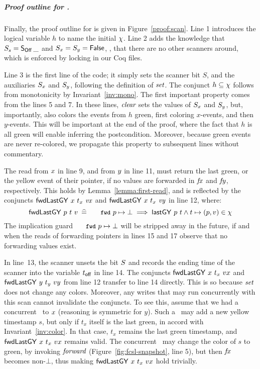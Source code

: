 

\subparagraph{Proof outline for \jyscan.}
%
Finally, the proof outline for is given in
Figure~\ref{proof:scan}. Line 1 introduces the logical variable $h$ to
name the initial $\chi$. Line 2 adds the knowledge that $S_s =
\mathsf{S_{Off}}\, \_$ and $S_x = S_y = \mathsf{False}$, \ie, that there are no other
scanners around, which is enforced by locking in our Coq files.

Line 3 is the first line of the code; it simply sets the scanner bit
$S$, and the auxiliaries $S_x$ and $S_y$, following the definition of
$\textit{set}$. The conjunct $h \subseteq \chi$ follows from
monotonicity by Invariant~\ref{inv:mono}.
%
The first important property comes from the lines 5 and 7. In these
lines, $\textit{clear}$ sets the values of $S_x$ and $S_y$, but,
importantly, also colors the events from $h$ green, first coloring
$x$-events, and then $y$-events. This will be important at the end of
the proof, where the fact that $h$ is all green will enable inferring
the postcondition. Moreover, because green events are never
re-colored, we propagate this property to subsequent lines without
commentary.

The read from $x$ in line 9, and from $y$ in line 11, must return
the last green, or the yellow event of their pointer, if no values are
forwarded in $\mathit{fx}$ and $\mathit{fy}$, respectively. This holds by
Lemma~\ref{lemma:first-read}, and is reflected by the conjuncts
$\botLGY\ x\ t_x\ \var{vx}$ and $\botLGY\ x\ t_x\ \var{vy}$ in line
12, where:
%
\[
 \hfill \botLGY\ p\ t\ v \eqdef \aleksfwdp{p} \hpts \bot
 \implies \lgVy\ p\ t \wedge t \hpts (p, v) \in \hist \hfill
\]
%
The implication guard $\aleksfwdp{p} \hpts \bot$ will be stripped away
in the future, if and when the reads of forwarding pointers in lines
15 and 17 observe that no forwarding values exist.

In line~13, the scanner unsets the bit $S$ and records the ending
time of the scanner into the variable $t_{\mathsf{off}}$ in line 14. The
conjuncts $\botLGY\ x\ t_x\ vx$ and ${\mathsf{fwdLastGY}}\ y\ t_y\ vy$ from line 12
transfer to line 14 directly. This is so because $\textit{set}$ does not
change any colors. Moreover, any writes that may run concurrently with
this scan cannot invalidate the conjuncts. To see this, assume that we
had a concurrent \jywrite\ to $x$ (reasoning is symmetric for $y$).
Such a \jywrite\ may add a new yellow timestamp $s$, but only if $t_x$
itself is the last green, in accord with Invariant~\ref{inv:color}. In
that case, $t_x$ remains the last green timestamp, and
$\botLGY\ x\ t_x\ vx$ remains valid. The concurrent \jywrite\ may
change the color of $s$ to green, by invoking $\textit{forward}$
(Figure~\ref{fig:fcsl-snapshot}, line 5), but then $\mathit{fx}$ becomes
non-$\bot$, thus making $\botLGY\ x\ t_x\ vx$ hold trivially.

